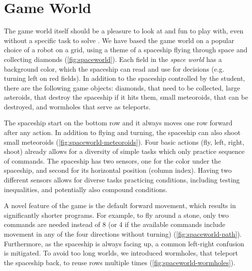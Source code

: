 

\section{Game World}  %
\label{sec:robomission.game-world}

The game world itself should be a pleasure to look at and fun to play with,
even without a specific task to solve \cite{book-of-lenses}.
We have based the game world on a popular choice of a robot on a grid,
using a theme of a spaceship flying through space and collecting diamonds
(\cref{fig:spaceworld}).
Each field in the \emph{space world} has a background color, which
the spaceship can read and use for decisions (e.g. turning left on red fields).
In addition to the spaceship controlled by the student,
there are the following game objects:
diamonds, that need to be collected,
large asteroids, that destroy the spaceship if it hits them,
small meteoroids, that can be destroyed,
and wormholes that serve as teleports.

The spaceship start on the bottom row and it always moves one row forward
after any action. %
In addition to flying and turning, the spaceship can also shoot small meteoroids
(\cref{fig:spaceworld-meteoroids}).
Four basic actions (fly, left, right, shoot) already allows for a
diversity of simple tasks which only practice sequence of commands.
The spaceship has two sensors, one for the color under the spaceship, and
second for its horizontal position (column index). Having two different sensors allows
for diverse tasks practicing conditions, including testing inequalities, and
potentially also compound conditions.

A novel feature of the game is the default forward movement,
which results in significantly shorter programs.
For example, to fly around a stone, only two commands are needed %
instead of 8 (or 4 if the available commands include
movement in any of the four directions without turning)
(\cref{fig:spaceworld-path}).
Furthermore, as the spaceship is always facing up, a common left-right
confusion \cite{blockly-10-things} is mitigated.
To avoid too long worlds, we introduced wormholes, that teleport the
spaceship back, to reuse rows multiple times
(\cref{fig:spaceworld-wormholes}).



